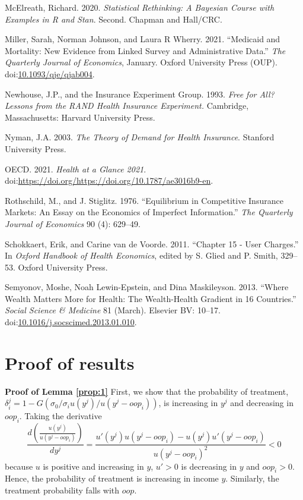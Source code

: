 \documentclass[a4paper,12pt]{article}
\begin{document}
\hypertarget{citeproc_bib_item_17}{McElreath, Richard. 2020. \textit{Statistical Rethinking: A Bayesian Course with Examples in R and Stan}. Second. Chapman and Hall/CRC.}

\hypertarget{citeproc_bib_item_18}{Miller, Sarah, Norman Johnson, and Laura R Wherry. 2021. “Medicaid and Mortality: New Evidence from Linked Survey and Administrative Data.” \textit{The Quarterly Journal of Economics}, January. Oxford University Press (OUP). doi:\href{https://doi.org/10.1093/qje/qjab004}{10.1093/qje/qjab004}.}

\hypertarget{citeproc_bib_item_19}{Newhouse, J.P., and the Insurance Experiment Group. 1993. \textit{Free for All? Lessons from the RAND Health Insurance Experiment.} Cambridge, Massachusetts: Harvard University Press.}

\hypertarget{citeproc_bib_item_20}{Nyman, J.A. 2003. \textit{The Theory of Demand for Health Insurance}. Stanford University Press.}

\hypertarget{citeproc_bib_item_21}{OECD. 2021. \textit{Health at a Glance 2021}. doi:\url{https://doi.org/https://doi.org/10.1787/ae3016b9-en}.}

\hypertarget{citeproc_bib_item_22}{Rothschild, M., and J. Stiglitz. 1976. “Equilibrium in Competitive Insurance Markets: An Essay on the Economics of Imperfect Information.” \textit{The Quarterly Journal of Economics} 90 (4): 629–49.}

\hypertarget{citeproc_bib_item_23}{Schokkaert, Erik, and Carine van de Voorde. 2011. “Chapter 15 - User Charges.” In \textit{Oxford Handbook of Health Economics}, edited by S. Glied and P. Smith, 329–53. Oxford University Press.}

\hypertarget{citeproc_bib_item_24}{Semyonov, Moshe, Noah Lewin-Epstein, and Dina Maskileyson. 2013. “Where Wealth Matters More for Health: The Wealth-Health Gradient in 16 Countries.” \textit{Social Science \& Medicine} 81 (March). Elsevier BV: 10–17. doi:\href{https://doi.org/10.1016/j.socscimed.2013.01.010}{10.1016/j.socscimed.2013.01.010}.}\bigskip



\newpage
\appendix

\section{Proof of results}
\label{sec:orgb489a3d}

\textbf{Proof of Lemma \ref{prop:1}}
First, we show that the probability of treatment, \(\delta_i^j = 1-G(\sigma_0/\sigma_i u(y^j)/u(y^j-oop_{i}))\), is increasing in \(y^j\) and decreasing in \(oop_{i}\). Taking the derivative
\begin{equation}
\label{eq:treatment_y}
\frac{d \left( \frac{u(y^{j})}{u(y^{j}-oop_{i})} \right)}{dy^j} = \frac{u'(y^{j})u(y^j-oop_{i}) - u(y^{j})u'(y^{j}-oop_{i})}{u(y^j-oop_{i})^2} < 0
\end{equation}
because \(u\) is positive and increasing in \(y\), \(u'>0\) is decreasing in \(y\) and \(oop_{i} >0\). Hence, the probability of treatment is increasing in income \(y\). Similarly, the treatment probability falls with \(oop\).
\end{document}
